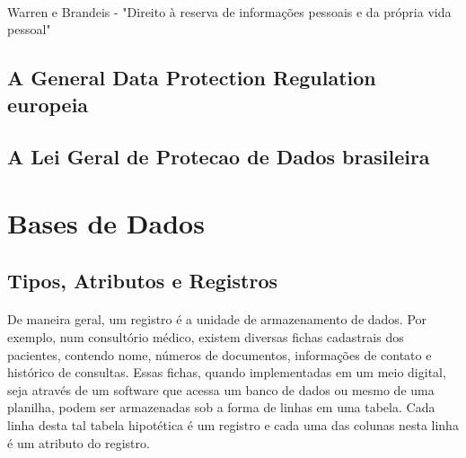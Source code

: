 \paragraph{} Warren e Brandeis - "Direito à reserva de informações pessoais e da própria vida pessoal"

\subsection{A General Data Protection Regulation europeia}

\paragraph{}

\subsection{A Lei Geral de Protecao de Dados brasileira}

\paragraph{}

\section{Bases de Dados}

\subsection{Tipos, Atributos e Registros}

\paragraph{} De maneira geral, um registro é a unidade de armazenamento de dados. Por exemplo, num consultório médico, existem
diversas fichas cadastrais dos pacientes, contendo nome, números de documentos, informações de contato 
e histórico de consultas. Essas fichas, quando implementadas em um meio digital, seja através de um software que acessa um banco de dados ou mesmo de uma planilha, podem ser armazenadas sob a forma de linhas em uma tabela. Cada linha desta tal tabela hipotética é um registro e cada uma das colunas nesta linha é um atributo do registro.

